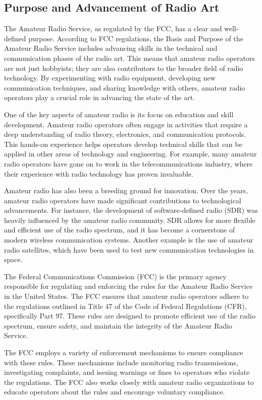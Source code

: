 \subsection{Purpose and Advancement of Radio Art}
\label{subsec:purpose-advancement}

The Amateur Radio Service, as regulated by the FCC, has a clear and well-defined purpose. According to FCC regulations, the Basis and Purpose of the Amateur Radio Service includes advancing skills in the technical and communication phases of the radio art. This means that amateur radio operators are not just hobbyists; they are also contributors to the broader field of radio technology. By experimenting with radio equipment, developing new communication techniques, and sharing knowledge with others, amateur radio operators play a crucial role in advancing the state of the art.

One of the key aspects of amateur radio is its focus on education and skill development. Amateur radio operators often engage in activities that require a deep understanding of radio theory, electronics, and communication protocols. This hands-on experience helps operators develop technical skills that can be applied in other areas of technology and engineering. For example, many amateur radio operators have gone on to work in the telecommunications industry, where their experience with radio technology has proven invaluable.

Amateur radio has also been a breeding ground for innovation. Over the years, amateur radio operators have made significant contributions to technological advancements. For instance, the development of software-defined radio (SDR) was heavily influenced by the amateur radio community. SDR allows for more flexible and efficient use of the radio spectrum, and it has become a cornerstone of modern wireless communication systems. Another example is the use of amateur radio satellites, which have been used to test new communication technologies in space.


The Federal Communications Commission (FCC) is the primary agency responsible for regulating and enforcing the rules for the Amateur Radio Service in the United States. The FCC ensures that amateur radio operators adhere to the regulations outlined in Title 47 of the Code of Federal Regulations (CFR), specifically Part 97. These rules are designed to promote efficient use of the radio spectrum, ensure safety, and maintain the integrity of the Amateur Radio Service.

The FCC employs a variety of enforcement mechanisms to ensure compliance with these rules. These mechanisms include monitoring radio transmissions, investigating complaints, and issuing warnings or fines to operators who violate the regulations. The FCC also works closely with amateur radio organizations to educate operators about the rules and encourage voluntary compliance.

